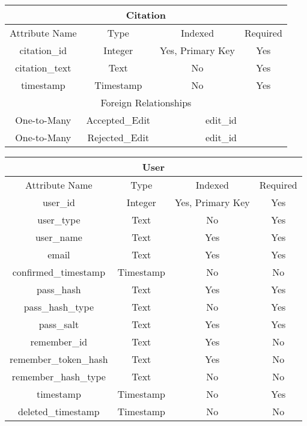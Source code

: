 \documentclass[12pt,letterpaper]{article}
\begin{document}
\vspace*{.4cm}
\begin{center}
\label{Citation}
\begin{tabular}{|c|c|c|c|}
\hline
\multicolumn{4}{|c|}{Citation} \\ \hline
Attribute Name & Type & Indexed & Required \\ \hline
citation\_id & Integer & Yes, Primary Key & Yes \\ \hline
citation\_text & Text & No & Yes \\ \hline
timestamp & Timestamp & No & Yes \\ \hline
\multicolumn{4}{|c|}{Foreign Relationships} \\ \hline
One-to-Many & Accepted\_Edit & \multicolumn{2}{c|}{edit\_id} \\ \hline %
One-to-Many & Rejected\_Edit & \multicolumn{2}{c|}{edit\_id} \\ \hline %
\end{tabular}
\end{center}


\vspace{.6cm}
\begin{center}
\label{User}
\begin{tabular}{|c|c|c|c|}
\hline
\multicolumn{4}{|c|}{User} \\ \hline
Attribute Name & Type & Indexed & Required \\ \hline
user\_id & Integer & Yes, Primary Key & Yes \\ \hline
user\_type & Text & No & Yes \\ \hline	%
user\_name & Text & Yes & Yes \\ \hline
email & Text & Yes & Yes \\ \hline
confirmed\_timestamp & Timestamp & No & No \\ \hline
pass\_hash & Text & Yes & Yes \\ \hline
pass\_hash\_type & Text & No & Yes \\ \hline
pass\_salt & Text & Yes & Yes \\ \hline
remember\_id & Text & Yes & No \\ \hline
remember\_token\_hash & Text & Yes & No \\ \hline
remember\_hash\_type & Text & No & No \\ \hline
timestamp & Timestamp & No & Yes \\ \hline
deleted\_timestamp & Timestamp & No & No \\ \hline
\end{tabular}
\end{center}
\end{document}
